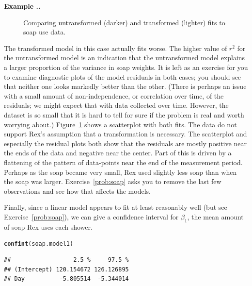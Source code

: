 \documentclass[twoside]{book}\usepackage[]{graphicx}\usepackage[]{xcolor}
\makeatletter
\newcommand{\hlstd}[1]{\textcolor[rgb]{0.345,0.345,0.345}{#1}}%
\newcommand{\hlkwd}[1]{\textcolor[rgb]{0.737,0.353,0.396}{\textbf{#1}}}%
\newenvironment{kframe}{%
 \def\at@end@of@kframe{}%
 \ifinner\ifhmode%
  \def\at@end@of@kframe{\end{minipage}}%
  \begin{minipage}{\columnwidth}%
 \fi\fi%
 \def\FrameCommand##1{\hskip\@totalleftmargin \hskip-\fboxsep
 \colorbox{shadecolor}{##1}\hskip-\fboxsep
     \hskip-\linewidth \hskip-\@totalleftmargin \hskip\columnwidth}%
 \MakeFramed {\advance\hsize-\width
   \@totalleftmargin\z@ \linewidth\hsize
   \@setminipage}}%
 {\par\unskip\endMakeFramed%
 \at@end@of@kframe}
\newenvironment{knitrout}{}{} %
\newcommand{\Rindex}[1]{\index{\texttt{#1}}}
\newcounter{example}[section]
\newenvironment{example}%
{\refstepcounter{example}%
\textbf{Example \thesection.\arabic{example}. }}%
{}
\makeatother
\begin{document}
\begin{example}
\begin{figure}
\caption{Comparing untransformed (darker) and transformed 
(lighter) fits to soap use data.}
\label{fig:soap}%
\end{figure}
%
The transformed model in this case actually fits worse.
The higher value of $r^2$ for the untransformed model is an indication 
that the untransformed model explains a larger proportion of the variance in soap weights.  It is left as an exercise for you to examine diagnostic plots of the model residuals in both cases; you should see that neither one looks markedly better than the other. (There is perhaps an issue with a small amount of non-independence, or correlation over time, of the residuals; we might expect that with data collected over time.  However, the dataset is so small that it is hard to tell for sure if the problem is real and worth worrying about.)  
Figure~\ref{fig:soap} shows a scatterplot
with both fits.  
The data do not support Rex's assumption that a transformation
is necessary.  
The scatterplot and especially the residual plots both show that the 
residuals are mostly positive near the ends of the data and negative
near the center.  Part of this is driven by a flattening of the pattern
of data-points near the end of the measurement period.  Perhaps as the soap
became very small, Rex used slightly less soap than when the soap was
larger.
Exercise~\ref{prob:soap} asks you to remove the last few observations
and see how that affects the models.

Finally, since a linear model appears to fit at least reasonably well
(but see Exercise~\ref{prob:soap}), 
we can give a confidence interval for $\beta_1$, 
the mean amount of soap Rex uses each shower.
%
%
\Rindex{confint()}%
\begin{knitrout}
\color{fgcolor}\begin{kframe}
\begin{alltt}
\hlkwd{confint}\hlstd{(soap.model1)}
\end{alltt}
\begin{verbatim}
##                  2.5 %     97.5 %
## (Intercept) 120.154672 126.126895
## Day          -5.805514  -5.344014
\end{verbatim}
\end{kframe}
\end{knitrout}
\end{example}
\end{document}
